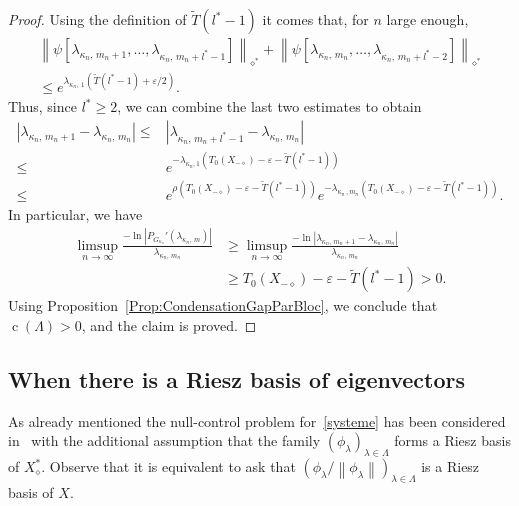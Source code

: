 \documentclass[11pt]{article}
\theoremstyle{definition}
\numberwithin{equation}{section}
\numberwithin{figure}{section}
\numberwithin{table}{section}
\newcommand{\Xalphas}{X_\diamond^*}
\newcommand{\Xmalpha}{X_{-\diamond}}
\newcommand{\normeX}[1]{\left\| #1 \right\|}
\newcommand{\normeXalphas}[1]{\left\| #1 \right\|_{\diamond^*}}
\DeclareMathOperator{\cond}{c}
\begin{document}
\begin{proof}
Using the definition of $\widetilde{T}(l^*-1)$ it comes that, for $n$ large enough,
\begin{multline*}
\normeXalphas{ \psi[\lambda_{\kappa_n,\,m_n+1},\dots,\lambda_{\kappa_n,\,m_n+l^*-1}] } + \normeXalphas{ \psi[\lambda_{\kappa_n,\,m_n},\dots,\lambda_{\kappa_n,\,m_n+l^*-2}] } \\
\leq e^{\lambda_{\kappa_n,\,1} \left(\widetilde{T}(l^*-1) + \varepsilon/2\right)}.
\end{multline*}
Thus, since $l^*\geq 2$, we can combine the last two estimates to obtain
\begin{equation*}
\begin{aligned}
\left| \lambda_{\kappa_n,\,m_n+1} - \lambda_{\kappa_n,\,m_n} \right| \leq & \left| \lambda_{\kappa_n,\,m_n+l^*-1} - \lambda_{\kappa_n,\,m_n} \right| \\
\leq & e^{-\lambda_{\kappa_n,1} \left(T_0(\Xmalpha)-\varepsilon - \widetilde{T}(l^*-1)\right)}\\
\leq & e^{\rho\left(T_0(\Xmalpha)-\varepsilon - \widetilde{T}(l^*-1)\right)} e^{-\lambda_{\kappa_n\,,m_n} \left(T_0(\Xmalpha)-\varepsilon - \widetilde{T}(l^*-1)\right)}.
\end{aligned}
\end{equation*}
In particular, we have
\begin{align*}
\limsup_{n \to \infty} \frac{-\ln |P_{G_{\kappa_n}}'(\lambda_{\kappa_n,\,m}) |}{\lambda_{\kappa_n,\,m_n}}& \geq \limsup_{n \to \infty} \frac{-\ln |\lambda_{\kappa_n,\,m_n+1} - \lambda_{\kappa_n,\,m_n}|}{\lambda_{\kappa_n,\,m_n}} \\
& \geq T_0(\Xmalpha)-\varepsilon - \widetilde{T}(l^*-1) > 0.
\end{align*}
Using Proposition~\ref{Prop:CondensationGapParBloc}, we conclude that $\cond(\Lambda)>0$, and the claim is proved.
\end{proof}



\subsection{When there is a Riesz basis of eigenvectors} \label{Subsec:BaseRiesz}


As already mentioned the null-control problem for~\eqref{systeme} has been considered in~\cite{AmmarKhodjaBenabdallahGonzalez-BurgosdeTeresa:2014} with the additional assumption that the family $(\phi_\lambda)_{\lambda\in \Lambda}$ forms a Riesz basis of $\Xalphas$. Observe that it is equivalent to ask that $(\phi_\lambda/\normeX{\phi_\lambda})_{\lambda\in \Lambda}$ is a Riesz basis of $X$.
\end{document}
